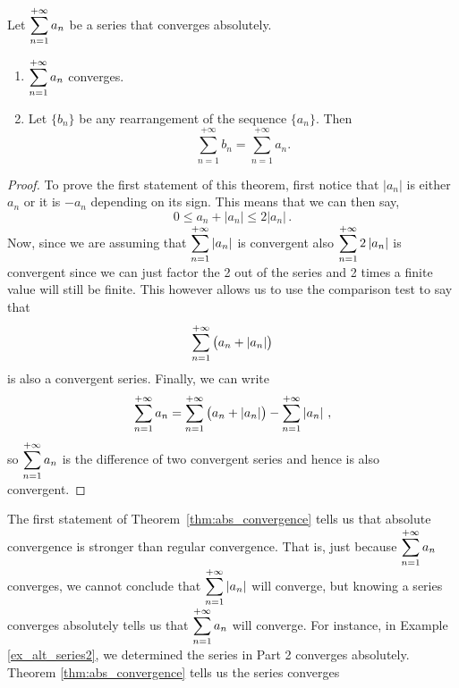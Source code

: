 \begin{theorem}\label{thm:abs_convergence}
{\footnotesize $\,$}\vspace*{-0.75cm}

Let $\displaystyle \sum_{n=1}^{+\infty} a_n$ be a series that converges absolutely.
\begin{enumerate}
	\item $\displaystyle \sum_{n=1}^{+\infty} a_n$ converges.
	
	\item	Let $\{b_n\}$ be any rearrangement of the sequence $\{a_n\}$. Then 
	$$ \sum_{n=1}^{+\infty} b_n = \sum_{n=1}^{+\infty} a_n.$$
\end{enumerate}
\end{theorem}

\ifanalysis

\begin{proof}
To prove the first statement of this theorem, first notice that $\left|a_n\right|$ is either $a_n$ or it is $-a_n$ depending on its sign.  This means that we can then say,
$$
0\leq a_n+\left|a_n\right|\leq 2\left|a_n\right|\,.
$$
Now, since we are assuming that $\displaystyle \sum_{n=1}^{+\infty} \left|a_n\right|$ is convergent also $\displaystyle \sum_{n=1}^{+\infty} 2\left|a_n\right|$ is convergent since we can just factor the 2 out of the series and 2 times a finite value will still be finite.  This however allows us to use the comparison test to say that
$$
\displaystyle \sum_{n=1}^{+\infty} \left(a_n+\left|a_n\right| \right)
$$
is also a convergent series. Finally, we can write
$$
\displaystyle \sum_{n=1}^{+\infty} a_n=\displaystyle \sum_{n=1}^{+\infty} \left(a_n+\left|a_n\right|\right)-\displaystyle \sum_{n=1}^{+\infty} \left|a_n\right|\,,
$$
so $\displaystyle \sum_{n=1}^{+\infty} a_n$ is the difference of two convergent series and hence is also convergent.
\end{proof}

\fi

The first statement of Theorem~\ref{thm:abs_convergence} tells us  that absolute convergence is  stronger than regular convergence. That is, just because {\small$\displaystyle \sum_{n=1}^{+\infty} a_n$} converges, we cannot conclude that {\small$\displaystyle \sum_{n=1}^{+\infty} |a_n|$} will converge, but knowing a series converges absolutely tells us that {\small$\displaystyle \sum_{n=1}^{+\infty} a_n$} will converge. For instance, in Example \ref{ex_alt_series2}, we determined the series in Part 2 converges absolutely. Theorem \ref{thm:abs_convergence} tells us the series converges

